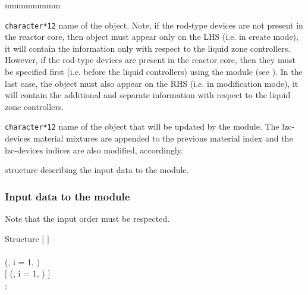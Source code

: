 \begin{ListeDeDescription}{mmmmmmmm}

\item[\dusa{DEVICE}] \texttt{character*12} name of the  object.
Note, if the rod-type devices are not present in the reactor core, then 
object must appear only on the LHS (i.e. in create mode), it will contain the information
only with respect to the liquid zone controllers. However, if the rod-type devices
are present in the reactor core, then they must be specified first (i.e. before the
liquid controllers) using the  module (see ). In the last
case, the  object must also appear on the RHS (i.e. in modification
mode), it will contain the additional and separate information with respect to the
liquid zone controllers.

\item[\dusa{MATEX}] \texttt{character*12} name of the  object
that will be updated by the module. The lzc-devices material mixtures are
appended to the previous material index and the lzc-devices indices are
also modified, accordingly.

\item[\dstr{desclzc}] structure describing the input data to the  module.

\end{ListeDeDescription}

\vskip 0.2cm

\subsubsection{Input data to the  module}\label{sect:lzcstr}

Note that the input order must be respected.

\begin{DataStructure}{Structure }
$[$   $]$ \\
  \\
(, i = 1, ) \\
$[$      (, i = 1, ) $]$ \\
;
\end{DataStructure}

